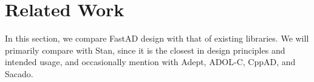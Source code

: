 \section{Related Work}\label{sec:related}

In this section, we compare FastAD design with that of existing libraries.
We will primarily compare with Stan, since it is the closest in design principles
and intended usage, and occasionally mention with Adept, ADOL-C, CppAD, and Sacado.






